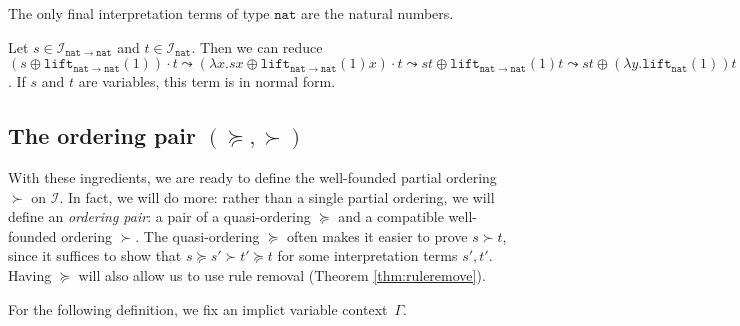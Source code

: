 \documentclass[a4paper,UKenglish,cleveref,autoref,numberwithinsect]{lipics-v2019}
\theoremstyle{definition}
\newcommand{\Iterms}{\mathcal{I}}
\newcommand{\arrtype}{\rightarrow}
\newcommand{\abs}[2]{\lambda #1.#2}
\newcommand{\arrW}{\leadsto}
\newcommand{\nat}{\mathtt{nat}}
\newcommand{\lift}{\mathtt{lift}}
\begin{document}
\begin{lemma}\label{lem_final_nat}
  The only final interpretation terms of type $\nat$ are the natural
  numbers.
\end{lemma}

\begin{example}\label{ex:arrWreduce}
Let $s \in \Iterms_{\nat \arrtype \nat}$ and $t \in
\Iterms_\nat$. Then we can reduce
$(s \oplus \lift_{\nat \arrtype \nat}(1)) \cdot t \arrW
(\abs{x}{s x \oplus \lift_{\nat \arrtype \nat}(1)x}) \cdot t \arrW
s t \oplus \lift_{\nat \arrtype \nat}(1)t \arrW
s t \oplus (\abs{y}{\lift_{\nat}(1)})t \arrW
s t \oplus \lift_\nat(1) \arrW
s t \oplus 1$. If $s$ and $t$ are variables, this term is in normal
form.
\end{example}

\subsection{The ordering pair $(\succeq,\succ)$}\label{subsec:succ}

With these ingredients, we are ready to define the well-founded
partial ordering $\succ$ on $\Iterms$.  In fact, we will do more: rather
than a single partial ordering, we will define an \emph{ordering pair}: a
pair of a quasi-ordering $\succeq$ and a compatible well-founded ordering
$\succ$. The quasi-ordering $\succeq$ often makes it easier to prove
$s \succ t$, since it suffices to show that $s \succeq s' \succ t'
\succeq t$ for some interpretation terms $s',t'$.  Having $\succeq$ will
also allow us to use rule removal (Theorem \ref{thm:ruleremove}).

For the following definition, we fix an
implict variable context~$\Gamma$.
\end{document}
